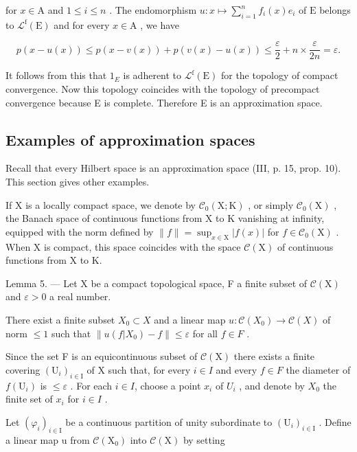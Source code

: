 for \(x \in \mathrm{A}\) and \(1 \leqslant i \leqslant n\) . The endomorphism \(u \colon x \mapsto \sum_{i=1}^{n} f_i(x)e_i\) of \(\mathrm{E}\) belongs to \(\mathcal{L}^{\mathrm{f}}(\mathrm{E})\) and for every \(x \in \mathrm{A}\) , we have

\[
p (x - u (x)) \leqslant p (x - v (x)) + p (v (x) - u (x)) \leqslant \frac {\varepsilon}{2} + n \times \frac {\varepsilon}{2 n} = \varepsilon .
\]

It follows from this that \(1_{E}\) is adherent to \(\mathcal{L}^{\mathrm{f}}(\mathrm{E})\) for the topology of compact convergence. Now this topology coincides with the topology of precompact convergence because E is complete. Therefore E is an approximation space.

\subsection{Examples of approximation spaces}

Recall that every Hilbert space is an approximation space (III, p. 15, prop. 10). This section gives other examples.

If X is a locally compact space, we denote by \(\mathcal{C}_{0}(\mathrm{X};\mathrm{K})\) , or simply \(\mathcal{C}_{0}(\mathrm{X})\) , the Banach space of continuous functions from X to K vanishing at infinity, equipped with the norm defined by \(\|f\|=\sup_{x\in\mathrm{X}}|f(x)|\) for \(f\in\mathcal{C}_{0}(\mathrm{X})\) . When X is compact, this space coincides with the space \(\mathcal{C}(\mathrm{X})\) of continuous functions from X to K.

Lemma 5. --- Let X be a compact topological space, F a finite subset of \(\mathcal{C}(\mathrm{X})\) and \(\varepsilon > 0\) a real number.

There exist a finite subset \(X_{0} \subset X\) and a linear map \(u: \mathcal{C}(X_{0}) \to \mathcal{C}(X)\) of norm \(\leqslant 1\) such that \(\|u(f|X_{0}) - f\| \leqslant \varepsilon\) for all \(f \in F\) .

Since the set F is an equicontinuous subset of \(\mathcal{C}(\mathrm{X})\) there exists a finite covering \((\mathrm{U}_{i})_{i\in\mathrm{I}}\) of X such that, for every \(i\in I\) and every \(f\in F\) the diameter of \(f(\mathrm{U}_{i})\) is \(\leqslant\varepsilon\) . For each \(i\in I\), choose a point \(x_{i}\) of \(U_{i}\) , and denote by \(X_{0}\) the finite set of \(x_{i}\) for \(i\in I\) .

Let \((\varphi_{i})_{i\in\mathrm{I}}\) be a continuous partition of unity subordinate to \((\mathrm{U}_{i})_{i\in\mathrm{I}}\) . Define a linear map u from \(\mathcal{C}(\mathrm{X}_{0})\) into \(\mathcal{C}(\mathrm{X})\) by setting


